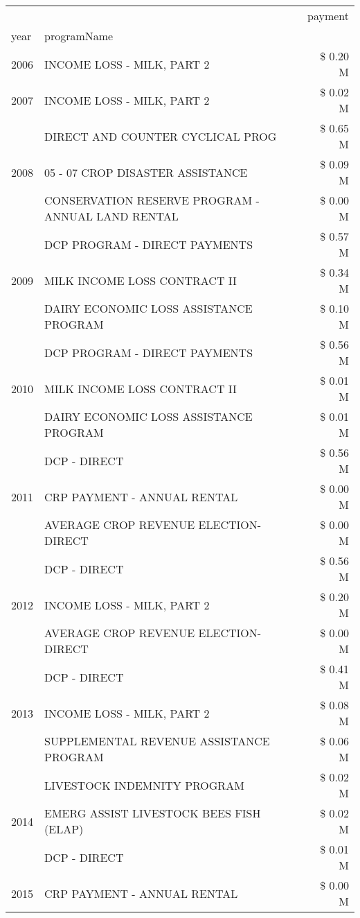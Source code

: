 \begin{tabular}{llr}
\toprule
 &  & payment \\
year & programName &  \\
\midrule
2006 & INCOME LOSS - MILK, PART 2 & \$ 0.20 M \\
\cline{1-3}
2007 & INCOME LOSS - MILK, PART 2 & \$ 0.02 M \\
\cline{1-3}
\multirow[t]{3}{*}{2008} & DIRECT AND COUNTER CYCLICAL PROG & \$ 0.65 M \\
 & 05 - 07 CROP DISASTER ASSISTANCE & \$ 0.09 M \\
 & CONSERVATION RESERVE PROGRAM - ANNUAL LAND RENTAL & \$ 0.00 M \\
\cline{1-3}
\multirow[t]{3}{*}{2009} & DCP PROGRAM - DIRECT PAYMENTS & \$ 0.57 M \\
 & MILK INCOME LOSS CONTRACT II & \$ 0.34 M \\
 & DAIRY ECONOMIC LOSS ASSISTANCE PROGRAM & \$ 0.10 M \\
\cline{1-3}
\multirow[t]{3}{*}{2010} & DCP PROGRAM - DIRECT PAYMENTS & \$ 0.56 M \\
 & MILK INCOME LOSS CONTRACT II & \$ 0.01 M \\
 & DAIRY ECONOMIC LOSS ASSISTANCE PROGRAM & \$ 0.01 M \\
\cline{1-3}
\multirow[t]{3}{*}{2011} & DCP - DIRECT & \$ 0.56 M \\
 & CRP PAYMENT - ANNUAL RENTAL & \$ 0.00 M \\
 & AVERAGE CROP REVENUE ELECTION-DIRECT & \$ 0.00 M \\
\cline{1-3}
\multirow[t]{3}{*}{2012} & DCP - DIRECT & \$ 0.56 M \\
 & INCOME LOSS - MILK, PART 2 & \$ 0.20 M \\
 & AVERAGE CROP REVENUE ELECTION-DIRECT & \$ 0.00 M \\
\cline{1-3}
\multirow[t]{3}{*}{2013} & DCP - DIRECT & \$ 0.41 M \\
 & INCOME LOSS - MILK, PART 2 & \$ 0.08 M \\
 & SUPPLEMENTAL REVENUE ASSISTANCE PROGRAM & \$ 0.06 M \\
\cline{1-3}
\multirow[t]{3}{*}{2014} & LIVESTOCK INDEMNITY PROGRAM & \$ 0.02 M \\
 & EMERG ASSIST LIVESTOCK BEES FISH (ELAP) & \$ 0.02 M \\
 & DCP - DIRECT & \$ 0.01 M \\
\cline{1-3}
\multirow[t]{2}{*}{2015} & CRP PAYMENT - ANNUAL RENTAL & \$ 0.00 M \\

\end{tabular}
